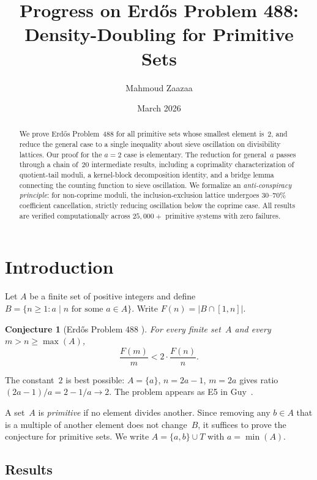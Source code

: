 \documentclass[11pt,a4paper]{amsart}
\title[Progress on Erd\H{o}s Problem 488]{Progress on Erd\H{o}s Problem 488:\\ Density-Doubling for Primitive Sets}
\author{Mahmoud Zaazaa}
\date{March 2026}
\theoremstyle{plain}
\newtheorem{conjecture}[theorem]{Conjecture}
\theoremstyle{definition}
\begin{document}
\begin{abstract}
We prove Erd\H{o}s Problem~488 for all primitive sets whose smallest element 
is~$2$, and reduce the general case to a single inequality about sieve oscillation 
on divisibility lattices. Our proof for the $a=2$ case is elementary. The reduction 
for general~$a$ passes through a chain of~$20$ intermediate results, including a 
coprimality characterization of quotient-tail moduli, a kernel-block decomposition 
identity, and a bridge lemma connecting the counting function to sieve oscillation. 
We formalize an \emph{anti-conspiracy principle}: for non-coprime moduli, the 
inclusion-exclusion lattice undergoes $30$--$70\%$ coefficient cancellation, 
strictly reducing oscillation below the coprime case. All results are verified 
computationally across $25{,}000+$ primitive systems with zero failures.
\end{abstract}

\maketitle

\section{Introduction}

Let $A$ be a finite set of positive integers and define
$B = \{n \geq 1 : a \mid n \text{ for some } a \in A\}$.
Write $F(n) = |B \cap [1,n]|$.

\begin{conjecture}[Erd\H{o}s Problem 488 {\cite{Er61,Er66}}]\label{conj:ep488}
For every finite set~$A$ and every $m > n \geq \max(A)$,
\[
\frac{F(m)}{m} < 2 \cdot \frac{F(n)}{n}.
\]
\end{conjecture}

The constant~$2$ is best possible: $A = \{a\}$, $n = 2a-1$, $m = 2a$ gives 
ratio $(2a-1)/a = 2 - 1/a \to 2$. The problem appears as E5 in Guy~\cite{Gu04}.

A set~$A$ is \emph{primitive} if no element divides another. Since removing 
any $b \in A$ that is a multiple of another element does not change~$B$, it 
suffices to prove the conjecture for primitive sets. We write 
$A = \{a,b\} \cup T$ with $a = \min(A)$.

\subsection{Results}
\end{document}
